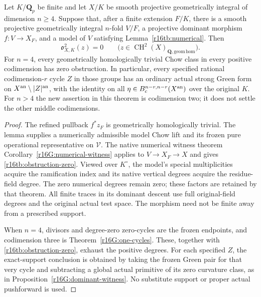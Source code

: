 \begin{theorem}
\label{r16tb:actual}
Let $K/\mathbf Q_p$ be finite and let $X/K$ be smooth projective
geometrically integral of dimension $n\geq4$. Suppose that, after
a finite extension $F/K$, there is a smooth projective geometrically
integral $n$-fold $V/F$, a projective dominant morphism
$f:V\to X_F$, and a model of $V$ satisfying
Lemma~\ref{r16tb:numerical}. Then
\[
 \mathfrak o_{X,K}^2(z)=0\qquad
 \bigl(z\in\operatorname{CH}^2(X)_{\mathbf Q,\mathrm{geom\,hom}}\bigr).
 \tag{TB16.6}\label{r16tb:obstruction-zero}
\]
For $n=4$, every geometrically homologically trivial Chow class
in every positive codimension has zero obstruction. In particular,
every specified rational codimension-$r$ cycle $Z$ in those groups
has an ordinary actual strong Green form on
$X^{\rm an}\setminus|Z|^{\rm an}$, with the identity on all
$\eta\in B_c^{n-r,n-r}(X^{\rm an})$ over the original $K$.
For $n>4$ the new assertion in this theorem is codimension two;
it does not settle the other middle codimensions.
\end{theorem}

\begin{proof}
The refined pullback $f^*z_F$ is geometrically homologically
trivial. The lemma supplies a numerically admissible model Chow
lift and its frozen pure operational representative on $\mathcal V$.
The native numerical witness theorem
Corollary~\ref{r16G:numerical-witness} applies to
$V\to X_F\to X$ and gives \eqref{r16tb:obstruction-zero}.
Viewed over $K^\circ$, the model's special multiplicities acquire
the ramification index and its native vertical degrees acquire
the residue-field degree. The zero numerical degrees remain zero;
these factors are retained by that theorem. All finite traces in
its dominant descent use full original-field degrees and the
original actual test space. The morphism need not be finite away
from a prescribed support.

When $n=4$, divisors and degree-zero zero-cycles are the frozen
endpoints, and codimension three is
Theorem~\ref{r16G:one-cycles}. These, together with
\eqref{r16tb:obstruction-zero}, exhaust the positive degrees.
For each specified $Z$, the exact-support conclusion is obtained
by taking the frozen Green pair for that very cycle and subtracting
a global actual primitive of its zero curvature class, as in
Proposition~\ref{r16G:dominant-witness}. No substitute support or
proper actual pushforward is used.
\end{proof}

